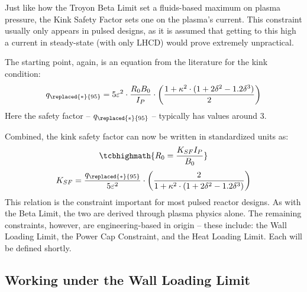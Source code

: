 Just like how the Troyon Beta Limit set a fluids-based maximum on plasma pressure, the Kink Safety Factor sets one on the plasma's current. This constraint usually only appears in pulsed designs, as it is assumed that getting to this high a current in steady-state (with only LHCD) would prove extremely unpractical.

The starting point, again, is an equation from the literature for the kink condition: \cite{process,oldpaper}
\begin{equation}
	q_{\replaced{*}{95}} = 5 \varepsilon^2 \cdot  \frac{ R_0 B_0 }{ I_P } \cdot \left( \frac{1 + \kappa^2 \cdot ( 1 + 2 \delta^2 - 1.2 \delta^3 ) }{2} \right)
\end{equation}
Here the safety factor -- $q_{\replaced{*}{95}}$ --  typically has values around 3. 

Combined, the kink safety factor can now be written in standardized units as:
\begin{equation}
	\label{eq:r_kink}
   \tcbhighmath{ R_0 = \frac{ K_{SF} I_P }{ B_0 } }
\end{equation}
\begin{equation}
  K_{SF} = \frac{q_{\replaced{*}{95}}}{5 \varepsilon^2} \cdot \left( \frac{2}{1 + \kappa^2 \cdot ( 1 + 2 \delta^2 - 1.2 \delta^3 ) } \right)
\end{equation}
This relation is the  constraint important for most pulsed reactor designs. As with the Beta Limit, the two are derived through plasma physics alone. The remaining  constraints, however, are engineering-based in origin -- these include: the Wall Loading Limit, the Power Cap Constraint, and the Heat Loading Limit. Each will be defined shortly.

\subsection{Working under the Wall Loading Limit}

